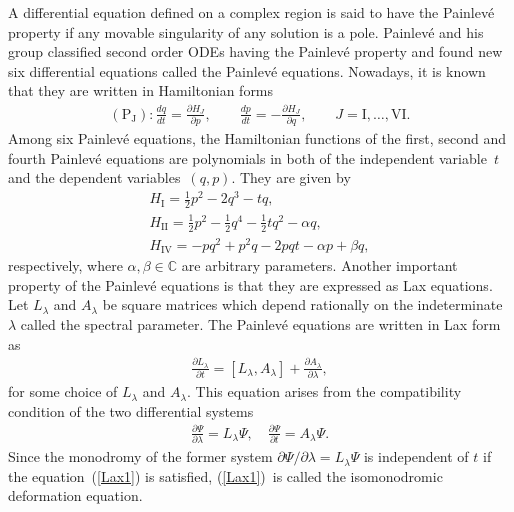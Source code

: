 \documentclass[pdftex]{sigma}
\numberwithin{equation}{section}
\begin{document}
A dif\/ferential equation def\/ined on a complex region is said to have the Painlev\'{e} property if any movable singularity of any solution is a pole. Painlev\'{e} and his group classif\/ied second order ODEs having the Painlev\'{e} property and found new six dif\/ferential equations called the Painlev\'{e} equations. Nowadays, it is known that they are written in Hamiltonian forms
\begin{gather*}
(\text{P}_\text{J})\colon \frac{dq}{dt} = \frac{\partial H_J}{\partial p}, \qquad
\frac{dp}{dt} = -\frac{\partial H_J}{\partial q}, \qquad J = \text{I}, \dots, \text{VI}.
\end{gather*}
Among six Painlev\'{e} equations, the Hamiltonian functions of the f\/irst, second and fourth Painlev\'{e} equations are polynomials in both of the independent variable~$t$ and the dependent variab\-les~$(q,p)$. They are given by
\begin{gather}
H_{\text{I}} = \frac{1}{2}p^2 - 2q^3 - tq, \label{2dimP1} \\
H_\text{II} = \frac{1}{2}p^2 - \frac{1}{2}q^4 - \frac{1}{2}tq^2 - \alpha q, \label{2dimP2} \\
H_\text{IV} = -pq^2 + p^2q - 2pqt - \alpha p + \beta q, \label{2dimP4}
\end{gather}
respectively, where $\alpha, \beta \in \mathbb{C}$ are arbitrary parameters. Another important property of the Painlev\'{e} equations is that they are expressed as Lax equations. Let $L_\lambda $ and $A_\lambda $ be square matrices which depend rationally on the indeterminate $\lambda $ called the spectral parameter. The Painlev\'{e} equations are written in Lax form as
\begin{gather}
\frac{\partial L_\lambda }{\partial t} = [L_\lambda , A_\lambda ] + \frac{\partial A_\lambda }{\partial \lambda },\label{Lax1}
\end{gather}
for some choice of $L_\lambda $ and $A_\lambda $. This equation arises from the compatibility condition of the two dif\/ferential systems
\begin{gather*}
\frac{\partial \Psi}{\partial \lambda } = L_\lambda \Psi, \quad \frac{\partial \Psi}{\partial t } = A_\lambda \Psi.
\end{gather*}
Since the monodromy of the former system $\partial \Psi/\partial \lambda = L_\lambda \Psi$ is independent of $t$ if the equation~(\ref{Lax1}) is satisf\/ied, (\ref{Lax1})~is called the isomonodromic deformation equation.
\end{document}
